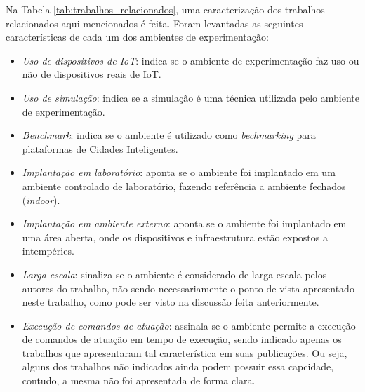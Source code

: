 Na Tabela \ref{tab:trabalhos_relacionados}, uma caracterização dos trabalhos relacionados aqui mencionados é feita.
Foram levantadas as seguintes características de cada um dos ambientes de experimentação:

\begin{itemize}
    \item \textit{Uso de dispositivos de IoT}: indica se o ambiente de experimentação faz uso ou não de dispositivos reais de IoT.

    \item \textit{Uso de simulação}: indica se a simulação é uma técnica utilizada pelo ambiente de experimentação.

    \item \textit{Benchmark}: indica se o ambiente é utilizado como \textit{bechmarking} para plataformas de Cidades Inteligentes.

    \item \textit{Implantação em laboratório}: aponta se o ambiente foi implantado em um ambiente controlado de laboratório, fazendo referência a ambiente fechados (\textit{indoor}).

    \item \textit{Implantação em ambiente externo}: aponta se o ambiente foi implantado em uma área aberta, onde os dispositivos e infraestrutura estão expostos a intempéries.

    \item \textit{Larga escala}: sinaliza se o ambiente é considerado de larga escala pelos autores do trabalho, não sendo necessariamente o ponto de vista apresentado neste trabalho, como pode ser
        visto na discussão feita anteriormente.

    \item \textit{Execução de comandos de atuação}: assinala se o ambiente permite a execução de comandos de atuação em tempo de execução, sendo indicado apenas os trabalhos que apresentaram tal
        característica em suas publicações. Ou seja, alguns dos trabalhos não indicados ainda podem possuir essa capcidade, contudo, a mesma não foi apresentada de forma clara.
\end{itemize}


